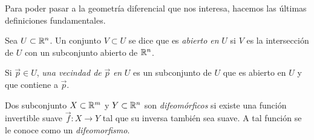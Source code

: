 Para poder pasar a la geometría diferencial que nos interesa, hacemos las últimas definiciones fundamentales.
\begin{definition}
	Sea $U \subset \mathbb R^n$. Un conjunto $V \subset U$ se dice que es \emph{abierto en} $U$ si $V$ es la intersección de $U$ con un subconjunto abierto de $\mathbb R^n$.
	
	Si $\vec p \in U$, \emph{una vecindad de} $\vec p$ \emph{en} $U$ es un subconjunto de $U$ que es abierto en $U$ y que contiene a $\vec p$.
\end{definition}

\begin{definition}
	Dos subconjunto $X \subset \mathbb R^m$ y $Y\subset \mathbb R^n$ son \emph{difeomórficos} si existe una función invertible suave $\vec f: X \to Y$ tal que su inversa también sea suave.  A tal función se le conoce como un \emph{difeomorfismo}.
\end{definition}